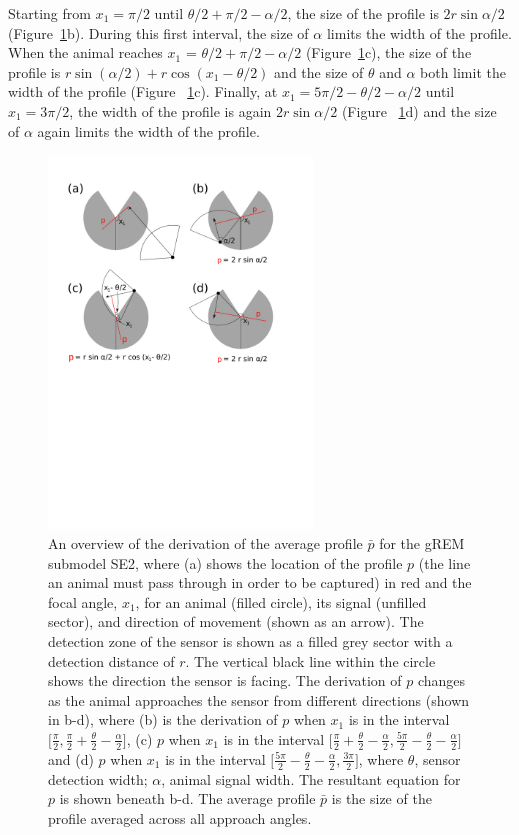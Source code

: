 \documentclass[a4paper,10pt,reqno,oneside]{amsart}
\begin{document}
Starting from $x_1 = \pi/2$ until $\theta/2 + \pi/2 - \alpha/2$, the size of the profile is $2r\sin \alpha/2$ (Figure~\ref{f:x1AndInt}b). During this first interval, the size of $\alpha$ limits the width of the profile. When the animal reaches $x_1$  = $\theta/2 + \pi/2 - \alpha/2$ (Figure~\ref{f:x1AndInt}c), the size of the profile is $r\sin( \alpha/2) + r\cos( x_1  - \theta/2)$ and the size of $\theta$ and $\alpha$ both limit the width of the profile (Figure~ \ref{f:x1AndInt}c). Finally, at $x_1  = 5\pi/2 - \theta/2  - \alpha/2$ until $x_1  = 3\pi/2$, the width of the profile is again $2r\sin\alpha/2$ (Figure~ \ref{f:x1AndInt}d) and the size of $\alpha$ again limits the width of the profile. 


\begin{figure}[t]
        \centering
	\includegraphics[width=7cm]{imgs/fourIntegrals.pdf}
\caption{An overview of the derivation of the average profile $\bar{p}$ for the gREM submodel SE2, where (a) shows the location of the profile $p$ (the line an animal must pass through in order to be captured) in red and the focal angle, $x_1$, for an animal (filled circle), its signal (unfilled sector), and direction of movement (shown as an arrow). The detection zone of the sensor is shown as a filled grey sector with a detection distance of $r$. The vertical black line within the circle shows the direction the sensor is facing. The derivation of $p$ changes as the animal approaches the sensor from different directions (shown in b-d), where (b) is the derivation of $p$ when $x_1$ is in the interval $\lbrack\frac{\pi}{2}, \frac{\pi}{2} + \frac{\theta}{2} - \frac{\alpha}{2}\rbrack$, (c)  $p$ when $x_1$ is in the interval $\lbrack\frac{\pi}{2} + \frac{\theta}{2} - \frac{\alpha}{2}, \frac{5 \pi}{2} - \frac{\theta}{2} - \frac{\alpha}{2} \rbrack$ and (d) $p$ when $x_1$ is in the interval $\lbrack\frac{5 \pi}{2} - \frac{\theta}{2} - \frac{\alpha}{2}, \frac{3 \pi}{2}\rbrack$, where $\theta$, sensor detection width; $\alpha$, animal signal width. The resultant equation for $p$ is shown beneath b-d. The average profile $\bar{p}$ is the size of the profile averaged across all approach angles.}
 	\label{f:x1AndInt}

\end{figure}
\end{document}
